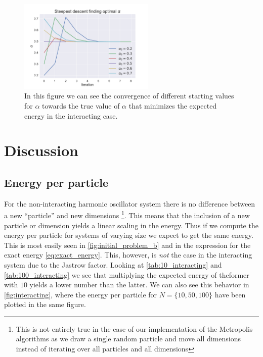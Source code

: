 \documentclass[
    a4paper, aps, twocolumn, floatfix, superscriptaddress, nofootinbib]{revtex4-1}
\newcommand{\1}{\mathds{1}}
\begin{document}
            \begin{figure}
                \includegraphics[width=244px]{../data/figures/problem_f.pdf}
                \caption{In this figure we can see the convergence of different
                starting values for $\alpha$ towards the true value of $\alpha$
                that minimizes the expected energy in the interacting case.}
                \label{fig:gradient_descent_interacting}
            \end{figure}

\section{Discussion}
    \subsection{Energy per particle}
        For the non-interacting harmonic oscillator system there is no
        difference between a new ``particle'' and new dimensions
        \footnote{This is not entirely true in the case of our implementation of
        the Metropolis algorithms as we draw a single random particle and move
        all dimensions instead of iterating over all particles and all
        dimensions}. This means that the inclusion of a new particle or
        dimension yields a linear scaling in the energy. Thus if we compute the
        energy per particle for systems of varying size we expect to get the
        same energy. This is most easily seen in \autoref{fig:initial_problem_b}
        and in the expression for the exact energy \autoref{eq:exact_energy}.
        This, however, is \textit{not} the case in the interacting system due to
        the Jastrow factor. Looking at \autoref{tab:10_interacting} and
        \autoref{tab:100_interacting} we see that multiplying the expected
        energy of theformer with $10$ yields a lower number than the latter. We
        can also see this behavior in \autoref{fig:interacting}, where the
        energy per particle for $N = \{10, 50, 100\}$ have been plotted in the
        same figure.
\end{document}
